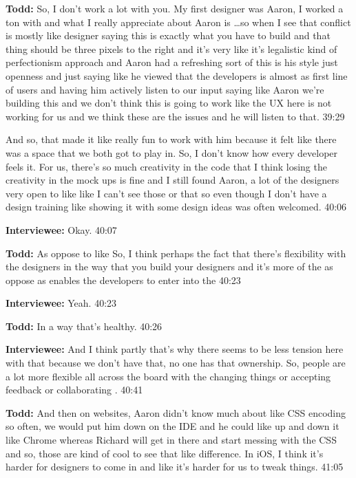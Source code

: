 \textbf{Todd:} So, I don't work a lot with you.  My first designer was Aaron, I worked a ton with and what I really appreciate about Aaron is \ldots so when I see that conflict is mostly like designer saying this is exactly what you have to build and that thing should be three pixels to the right and it's very like it's legalistic kind of perfectionism approach and Aaron had a refreshing sort of this is his style just openness and just saying  like he viewed that the developers is almost as first line of users and having him actively listen to our input saying like Aaron we're building this and we don't think this is going to work like the UX here is not working for us and we think these are the issues and he will listen to that.  39:29

And so, that made it like really fun to work with him because it felt like there was a space that we both got to play in.  So, I don't know how every developer feels it.  For us, there's so much creativity in the code that I think losing the creativity in the mock ups is fine and I still found Aaron, a lot of the designers very open to like  like I can't see those or that  so even though I don't have a design training like showing it with some design ideas was often welcomed.  40:06

\textbf{Interviewee:} Okay.  40:07

\textbf{Todd:} As oppose to like   So, I think perhaps the fact that there's flexibility with the designers in the way that you build your designers and it's more of the  as oppose as  enables the developers to enter into the   40:23

\textbf{Interviewee:} Yeah.  40:23

\textbf{Todd:} In a way that's healthy.  40:26

\textbf{Interviewee:} And I think partly that's why there seems to be less tension here with that because we don't have that, no one has that ownership.  So, people are a lot more flexible all across the board with the changing things or accepting feedback or collaborating .  40:41

\textbf{Todd:} And then on websites, Aaron didn't know much about like CSS encoding so often, we would put him down on the IDE and he could like up and down it like Chrome whereas Richard will get in there and start messing with the CSS and so, those are kind of cool to see that like difference.  In iOS, I think it's harder for designers to come in and like it's harder for us to tweak things.  41:05

